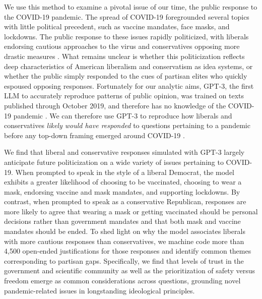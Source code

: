\documentclass{article} %
\begin{document}
We use this method to examine a pivotal issue of our time, the public
response to the COVID-19 pandemic. The spread of COVID-19 foregrounded
several topics with little political precedent, such as vaccine
mandates, face masks, and lockdowns. The public response to these issues
rapidly politicized, with liberals endorsing cautious approaches to the
virus and conservatives opposing more drastic measures
\parencite{Gadarian2021-su}. What remains unclear is whether this politicization
reflects deep characteristics of American liberalism and conservatism as
idea systems, or whether the public simply responded to the cues of
partisan elites who quickly espoused opposing responses. Fortunately for
our analytic aims, GPT-3, the first LLM to accurately reproduce patterns
of public opinion, was trained on texts published through October 2019,
and therefore has no knowledge of the COVID-19 pandemic
\parencite{OpenAI2023-wo}. We can
therefore use GPT-3 to reproduce how liberals and conservatives
\emph{likely would have responded} to questions pertaining to a pandemic
before any top-down framing emerged around COVID-19
\parencite{Kaplan2008-nm}.

We find that liberal and conservative responses simulated with GPT-3
largely anticipate future politicization on a wide variety of issues
pertaining to COVID-19. When prompted to speak in the style of a liberal
Democrat, the model exhibits a greater likelihood of choosing to be
vaccinated, choosing to wear a mask, endorsing vaccine and mask
mandates, and supporting lockdowns. By contrast, when prompted to speak
as a conservative Republican, responses are more likely to agree that
wearing a mask or getting vaccinated should be personal decisions rather
than government mandates and that both mask and vaccine mandates should
be ended. To shed light on why the model associates liberals with more
cautious responses than conservatives, we machine code more than 4,500
open-ended justifications for those responses and identify common themes
corresponding to partisan gaps. Specifically, we find that levels of
trust in the government and scientific community as well as the
prioritization of safety versus freedom emerge as common considerations
across questions, grounding novel pandemic-related issues in
longstanding ideological principles.
\end{document}
